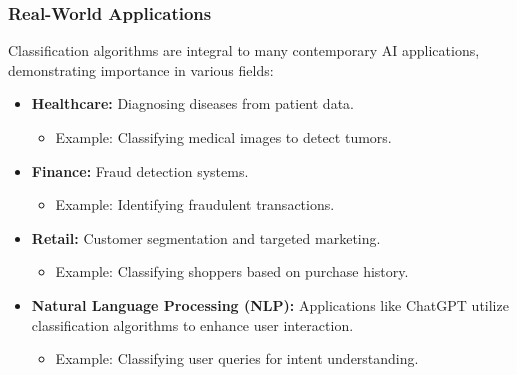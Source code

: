 \documentclass[aspectratio=169]{beamer}
\begin{document}
\begin{frame}[fragile]
    \frametitle{Real-World Applications}
    Classification algorithms are integral to many contemporary AI applications, demonstrating importance in various fields:
    \begin{itemize}
        \item \textbf{Healthcare:} Diagnosing diseases from patient data.
        \begin{itemize}
            \item Example: Classifying medical images to detect tumors.
        \end{itemize}
        
        \item \textbf{Finance:} Fraud detection systems.
        \begin{itemize}
            \item Example: Identifying fraudulent transactions.
        \end{itemize}
        
        \item \textbf{Retail:} Customer segmentation and targeted marketing.
        \begin{itemize}
            \item Example: Classifying shoppers based on purchase history.
        \end{itemize}
        
        \item \textbf{Natural Language Processing (NLP):} Applications like ChatGPT utilize classification algorithms to enhance user interaction.
        \begin{itemize}
            \item Example: Classifying user queries for intent understanding.
        \end{itemize}
    \end{itemize}
\end{frame}
\end{document}
